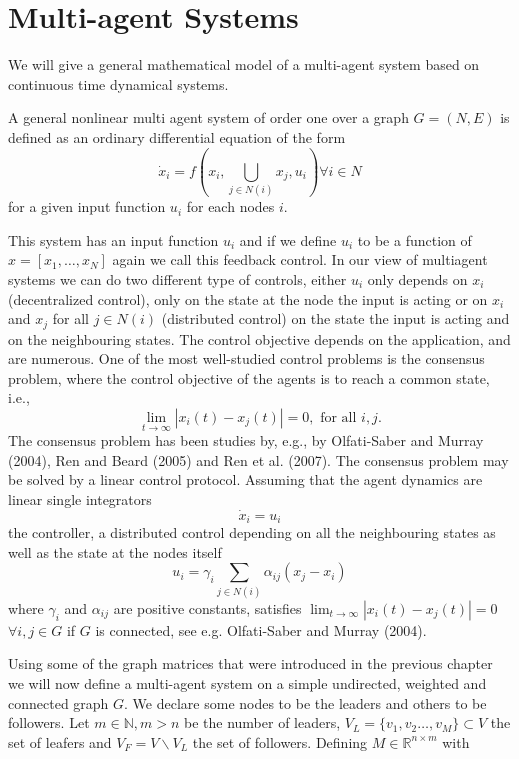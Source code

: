 
%
\section{Multi-agent Systems}


We will give a general mathematical model of a multi-agent system based on continuous time dynamical systems. 
\begin{definition} A general nonlinear multi agent system of order one over a graph $G=(N,E)$ is defined as an ordinary differential equation of the form
\[ \dot{x}_i= f(x_i,\bigcup_{j\in N(i)}x_j,u_i)\forall i\in N\] for a given input function $u_i$ for each nodes $i$.
\end{definition}
This system has an input function $u_i$ and if we define $u_i$ to be a function of $x=[x_1,\dots,x_N]$ again we call this feedback control. In our view of multiagent systems we can do two different type of controls, either $u_i$ only depends on  $x_i$ (decentralized control), only on the state at the node the input is acting or on 
$x_i$ and $x_j$ for all $j\in N(i)$ (distributed control) on the state the input is acting and on the neighbouring states. The control objective depends on the application, and are numerous. One of the most well-studied control problems is the consensus problem, where the control objective of the agents is to reach a common state, i.e., 
\[ \lim_{t\rightarrow \infty} |x_i(t)-x_j(t)|=0, \mbox{ for all }i,j.\]
 The consensus problem has been studies by, e.g., by Olfati-Saber and Murray (2004), Ren and Beard (2005) and Ren et al. (2007). The consensus problem may be solved by a linear control protocol. Assuming that the agent dynamics are linear single integrators
 \[\dot{x}_i=u_i\]
 the controller, a distributed control depending on all the neighbouring states as well as the state at the nodes itself
 \[u_i=\gamma_i \sum_{j\in N(i)} \alpha_{ij}(x_j-x_i) \]
where $\gamma_i$ and $\alpha_{ij}$ are positive constants, satisfies $\lim_{t\rightarrow \infty}|x_i(t)-x_j(t)|=0 $ $\forall i,j\in G$ if $G$ is connected, see e.g. Olfati-Saber and Murray (2004).





Using some of the graph matrices that were introduced in the previous chapter we will now define a multi-agent system on a simple undirected, weighted and connected graph $G$. We declare some nodes to be the leaders and others to be followers. Let $m\in \mathbb{N},m>n$ be the number of leaders, $V_L=\{v_1,v_2\dots,v_M\} \subset V$ the set of leafers and $V_F=V\backslash V_L$ the set of followers. Defining $M\in \mathbb{R}^{n\times m}$ with 

